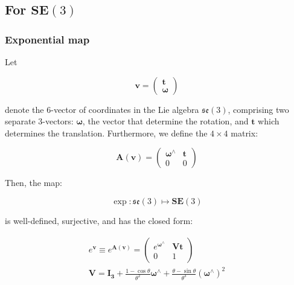 \documentclass[a4paper,11pt]{report}
\newcommand{\W}{{\bm{\omega}}}
\newcommand{\hatop}[1]{#1^\wedge}
\begin{document}
\subsection{For $\mathbf{SE}(3)$}
\label{eq:exp.log.se3}

\subsubsection{Exponential map}
\label{sect:se3_exp}

Let

\begin{equation}
\label{eq:vector_in_se3}
\mathbf{v}= \left( \begin{array}{c} \mathbf{t} \\ \W \end{array} \right)
\end{equation}

\noindent denote the 6-vector of coordinates in
the Lie algebra $\mathfrak{se}(3)$,
comprising
two separate 3-vectors: $\W$, the vector that determine
the rotation, and $\mathbf{t}$ which determines the translation.
Furthermore, we define the $4 \times 4$ matrix:

\begin{equation}
 \mathbf{A}(\mathbf{v})=
\left(
\begin{array}{cc}
 \hatop{\W}  & \mathbf{t} \\
 0 & 0
\end{array}
\right)
\end{equation}


Then, the map:

\begin{equation}
  \exp: \mathfrak{se}(3) \mapsto \mathbf{SE}(3)
\end{equation}

\noindent is well-defined, surjective, and has the closed form:

\begin{eqnarray}
\label{eq:se3.exp.map}
  e^ { \mathbf{v} } \equiv  e^ { \mathbf{A}(\mathbf{v}) } =
\left(
\begin{array}{cc}
  e^{\hatop{\W}} & \mathbf{V} \mathbf{t} \\
   0 & 1
\end{array}
\right)
\\
\label{eq:V_exp}
\mathbf{V} = \mathbf{I_3}
+ \frac{1-\cos \theta}{\theta^2} \hatop{\W}
+ \frac{\theta- \sin \theta}{\theta^3} (\hatop{\W})^2 
\end{eqnarray}
\end{document}
